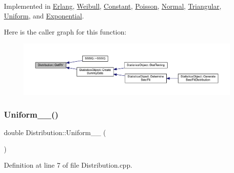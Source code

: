 Implemented in \hyperlink{class_erlang_a5ae5b56e37bd2c5ee4318fcc12259442}{Erlang}, \hyperlink{class_weibull_a0de3910ff51aeb87c49ccb5d34d1de0d}{Weibull}, \hyperlink{class_constant_a9eac5a0bdc360c859f187f8aa94dcd6d}{Constant}, \hyperlink{class_poisson_a068964aa05df4051b23a84d71529fb69}{Poisson}, \hyperlink{class_normal_a6101d2303601a4f7dfa33fe4b104df7e}{Normal}, \hyperlink{class_triangular_aadd53c452801be8c0eb6ffb31a299835}{Triangular}, \hyperlink{class_uniform_a9350886d5ad1854294ecff338a288fc7}{Uniform}, and \hyperlink{class_exponential_a2a45aeaf0a3725174d86712761a8dd82}{Exponential}.

Here is the caller graph for this function\+:\nopagebreak
\begin{figure}[H]
\begin{center}
\leavevmode
\includegraphics[width=350pt]{class_distribution_a63b433850d7b47d84eb69448f7916719_icgraph}
\end{center}
\end{figure}
\mbox{\label{class_distribution_a33965648e4c6d3bbc93c61ccd3897c98}} 
\subsubsection{\texorpdfstring{Uniform\+\_\+\_()}{Uniform\_0\_1()}}
{\footnotesize\ttfamily double Distribution\+::\+Uniform\+\_\+\_ (\begin{DoxyParamCaption}{ }\end{DoxyParamCaption})\hspace{0.3cm}{\ttfamily [protected]}}



Definition at line 7 of file Distribution.\+cpp.

